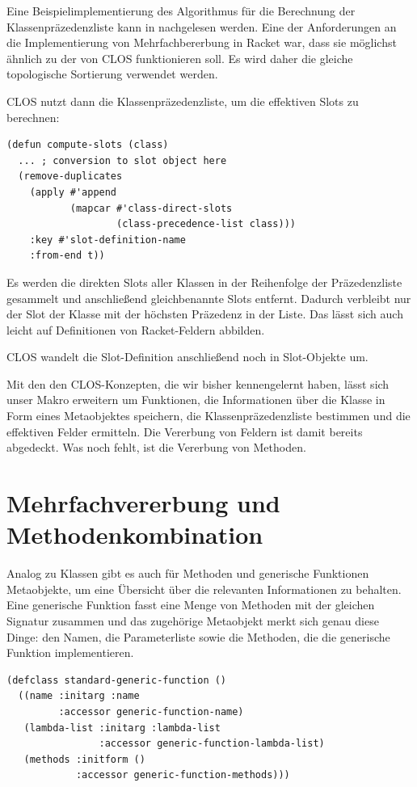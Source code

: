 Eine Beispielimplementierung des Algorithmus für die Berechnung der Klassenpräzedenzliste kann in \cite[S.24f,291f]{amop} nachgelesen werden. Eine der Anforderungen an die Implementierung von Mehrfachbererbung in Racket war, dass sie möglichst ähnlich zu der von CLOS funktionieren soll. Es wird daher die gleiche topologische Sortierung verwendet werden.

CLOS nutzt dann die Klassenpräzedenzliste, um die effektiven Slots zu berechnen:

\begin{lstlisting}
(defun compute-slots (class)
  ... ; conversion to slot object here
  (remove-duplicates
    (apply #'append 
           (mapcar #'class-direct-slots
                   (class-precedence-list class)))
    :key #'slot-definition-name
    :from-end t))
\end{lstlisting}

Es werden die direkten Slots aller Klassen in der Reihenfolge der Präzedenzliste gesammelt und anschließend gleichbenannte Slots entfernt. Dadurch verbleibt nur der Slot der Klasse mit der höchsten Präzedenz in der Liste. Das lässt sich auch leicht auf Definitionen von Racket-Feldern abbilden.

CLOS wandelt die Slot-Definition anschließend noch in Slot-Objekte um. %

Mit den den CLOS-Konzepten, die wir bisher kennengelernt haben, lässt sich  unser Makro erweitern um Funktionen, die Informationen über die Klasse in Form eines Metaobjektes speichern, die Klassenpräzedenzliste bestimmen und  die effektiven Felder ermitteln. Die Vererbung von Feldern ist damit bereits abgedeckt. Was noch fehlt, ist die Vererbung von Methoden.

\section{Mehrfachvererbung und Methodenkombination}
Analog zu Klassen gibt es auch für Methoden und generische Funktionen Metaobjekte, um eine Übersicht über die relevanten Informationen zu behalten. Eine generische Funktion fasst eine Menge von Methoden mit der gleichen Signatur zusammen und das zugehörige Metaobjekt merkt sich genau diese Dinge: den Namen, die Parameterliste sowie die Methoden, die die generische Funktion implementieren.

\begin{lstlisting}
(defclass standard-generic-function ()
  ((name :initarg :name
         :accessor generic-function-name)
   (lambda-list :initarg :lambda-list
                :accessor generic-function-lambda-list)
   (methods :initform ()
            :accessor generic-function-methods)))
\end{lstlisting}

